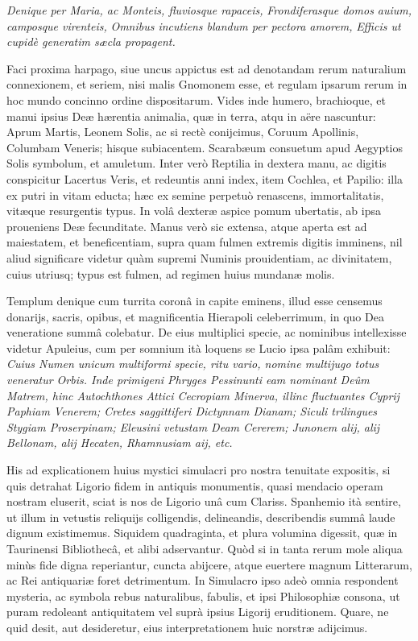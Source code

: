 \documentclass[a4paper, 11pt, oneside, polutonikogreek, latin]{article}
\begin{document}
\emph{Denique per Maria, ac Monteis, fluviosque rapaceis,}
\emph{Frondiferasque domos auium, camposque virenteis,}
\emph{Omnibus incutiens blandum per pectora amorem,}
\emph{Efficis ut cupidè generatim sæcla propagent.}

Faci proxima harpago, siue uncus appictus est ad denotandam rerum naturalium connexionem, et seriem, nisi malis Gnomonem esse, et regulam ipsarum rerum in hoc mundo concinno ordine dispositarum. Vides inde humero, brachioque, et manui ipsius Deæ hærentia animalia, quæ in terra, atqu in aëre nascuntur: Aprum Martis, Leonem Solis, ac si rectè conijcimus, Coruum Apollinis, Columbam Veneris; hisque subiacentem. Scarabæum consuetum apud Aegyptios Solis symbolum, et amuletum. Inter verò Reptilia in dextera manu, ac digitis conspicitur Lacertus Veris, et redeuntis anni index, item Cochlea, et Papilio: illa ex putri in vitam educta; hæc ex semine perpetuò renascens, immortalitatis, vitæque resurgentis typus. In volâ dexteræ aspice pomum ubertatis, ab ipsa proueniens Deæ fecunditate. Manus verò sic extensa, atque aperta est ad maiestatem, et beneficentiam, supra quam fulmen extremis digitis imminens, nil aliud significare videtur quàm supremi Numinis prouidentiam, ac divinitatem, cuius utriusq; typus est fulmen, ad regimen huius mundanæ molis.

Templum denique cum turrita coronâ in capite eminens, illud esse censemus donarijs, sacris, opibus, et magnificentia Hierapoli celeberrimum, in quo Dea veneratione summâ colebatur. De eius multiplici specie, ac nominibus intellexisse videtur Apuleius, cum per somnium ità loquens se Lucio ipsa palâm exhibuit: \emph{Cuius Numen unicum multiformi specie, ritu vario, nomine multijugo totus veneratur Orbis. Inde primigeni Phryges Pessinunti eam nominant Deûm Matrem, hinc Autochthones Attici Cecropiam Minerva, illinc fluctuantes Cyprij Paphiam Venerem; Cretes saggittiferi Dictynnam Dianam; Siculi trilingues Stygiam Proserpinam; Eleusini vetustam Deam Cererem; Junonem alij, alij Bellonam, alij Hecaten, Rhamnusiam aij, etc.}

His ad explicationem huius mystici simulacri pro nostra tenuitate expositis, si quis detrahat Ligorio fidem in antiquis monumentis, quasi mendacio operam nostram eluserit, sciat is nos de Ligorio unâ cum Clariss. Spanhemio ità sentire, ut illum in vetustis reliquijs colligendis, delineandis, describendis summâ laude dignum existimemus. Siquidem quadraginta, et plura volumina digessit, quæ in Taurinensi Bibliothecâ, et alibi adservantur. Quòd si in tanta rerum mole aliqua minùs fide digna reperiantur, cuncta abijcere, atque euertere magnum Litterarum, ac Rei antiquariæ foret detrimentum. In Simulacro ipso adeò omnia respondent mysteria, ac symbola rebus naturalibus, fabulis, et ipsi Philosophiæ consona, ut puram redoleant antiquitatem vel suprà ipsius Ligorij eruditionem. Quare, ne quid desit, aut desideretur, eius interpretationem huic norstræ adijcimus.
\end{document}
